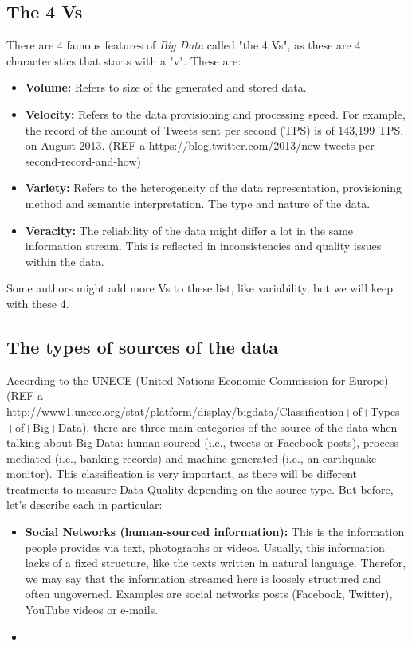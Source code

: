 \documentclass[%
 reprint,
 amsmath,amssymb,
 aps,
]{revtex4-1}
\begin{document}
\subsection{\label{sec:level1}The 4 Vs}

There are 4 famous features of \emph{Big Data} called "the 4 Vs", as these are 4 characteristics that starts with a "v". These are:

\begin{itemize}
  \item \textbf{Volume:} Refers to size of the generated and stored data.
  \item \textbf{Velocity:} Refers to the data provisioning and processing speed. For example, the record of the amount of Tweets sent per second (TPS) is of 143,199 TPS, on August 2013. (REF a https://blog.twitter.com/2013/new-tweets-per-second-record-and-how)
  \item \textbf{Variety:} Refers to the heterogeneity of the data representation, provisioning method and semantic interpretation. The type and nature of the data.
  \item \textbf{Veracity:} The reliability of the data might differ a lot in the same information stream. This is reflected in inconsistencies and quality issues within the data.
\end{itemize}

Some authors might add more Vs to these list, like variability, but we will keep with these 4.

\subsection{\label{sec:level1}The types of sources of the data}

According to the UNECE (United Nations Economic Commission for Europe)(REF a http://www1.unece.org/stat/platform/display/bigdata/Classification+of+Types+of+Big+Data), there are three main categories of the source of the data when talking about Big Data: human sourced (i.e., tweets or Facebook posts), process mediated (i.e., banking records) and machine generated (i.e., an earthquake monitor). This classification is very important, as there will be different treatments to measure Data Quality
depending on the source type. But before, let's describe each in particular:

\begin{itemize}
  \item \textbf{Social Networks (human-sourced information):} This is the information people provides via text, photographs or videos. Usually, this information lacks of a fixed structure, like the texts written in natural language. Therefor, we may say that the information streamed here is loosely structured and often ungoverned. Examples are social networks posts (Facebook, Twitter), YouTube videos or e-mails.
  \item \textbf{}
\end{itemize}
\end{document}

